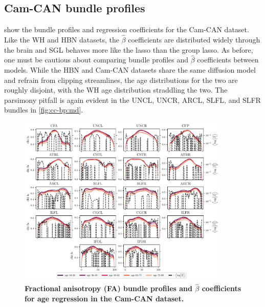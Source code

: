 \documentclass[10pt,letterpaper]{article}
\begin{document}
\subsection{Cam-CAN bundle profiles}

 show the bundle profiles and regression
coefficients for the Cam-CAN dataset. Like the WH and HBN datasets, the
$\hat{\beta}$ coefficients are distributed widely through the brain and SGL
behaves more like the lasso than the group lasso. As before, one must be
cautious about comparing bundle profiles and $\hat{\beta}$ coefficients
between models. While the HBN and Cam-CAN datasets share the same diffusion
model and refrain from clipping streamlines, the age distributions for the
two are roughly disjoint, with the WH age distribution straddling the two.
The parsimony pitfall is again evident in the UNCL, UNCR, ARCL, SLFL, and
SLFR bundles in \cref{fig:cc-bp:md}.

\begin{figure}
    \includegraphics[width=0.9\textwidth]{cc_coefs_profiles_fa.pdf}
    \caption{%
        {%
            \bf Fractional anisotropy (FA) bundle profiles and $\hat{\beta}$
            coefficients for age regression in the Cam-CAN dataset.
        }
        \label{fig:cc-bp:fa}
    }
\end{figure}
\end{document}
